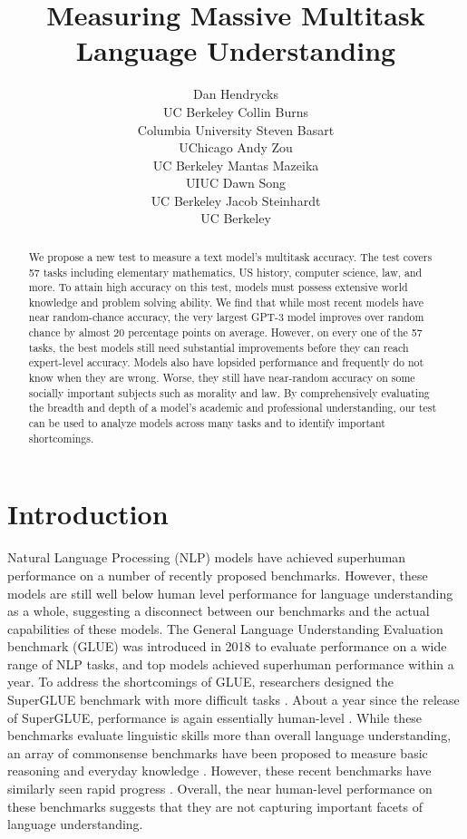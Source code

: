 \documentclass{article} \usepackage{iclr2021_conference, times}
\title{Measuring Massive Multitask\\Language Understanding}
\author{
Dan Hendrycks\\UC Berkeley \And Collin Burns\\Columbia University \And Steven Basart\\UChicago \And Andy Zou\\UC Berkeley \AND Mantas Mazeika\\UIUC \And Dawn Song\\UC Berkeley \And Jacob Steinhardt\\UC Berkeley\AND
}
\begin{document}
\maketitle

\vspace{-35pt}
\begin{abstract}
We propose a new test to measure a text model's multitask accuracy. The test covers 57 tasks including elementary mathematics, US history, computer science, law, and more. To attain high accuracy on this test, models must possess extensive world knowledge and problem solving ability. We find that while most recent models have near random-chance accuracy, the very largest GPT-3 model improves over random chance by almost 20 percentage points on average. However, on every one of the 57 tasks, the best models still need substantial improvements before they can reach expert-level accuracy. Models also have lopsided performance and frequently do not know when they are wrong. Worse, they still have near-random accuracy on some socially important subjects such as morality and law. By comprehensively evaluating the breadth and depth of a model's academic and professional understanding, our test can be used to analyze models across many tasks and to identify important shortcomings.
\end{abstract}









\section{Introduction}

Natural Language Processing (NLP) models have achieved superhuman performance on a number of recently proposed benchmarks. 
However, these models are still well below human level performance for language understanding as a whole, suggesting a disconnect between our benchmarks and the actual capabilities of these models. 
The General Language Understanding Evaluation benchmark (GLUE) \citep{wang2018glue} was introduced in 2018 to evaluate performance on a wide range of NLP tasks, and top models achieved superhuman performance within a year. To address the shortcomings of GLUE, researchers designed the SuperGLUE benchmark with more difficult tasks \citep{wang2019superglue}. About a year since the release of SuperGLUE, performance is again essentially human-level \citep{raffel2019exploringT5}. While these benchmarks evaluate linguistic skills more than overall language understanding, an array of commonsense benchmarks have been proposed to measure basic reasoning and everyday knowledge \citep{zellers2019hellaswag,huang2019cosmosqa,bisk2019physicaliqa}. 
However, these recent benchmarks have similarly seen rapid progress \citep{khashabi2020unifiedqa}. Overall, the near human-level performance on these benchmarks suggests that they are not capturing important facets of language understanding.
\end{document}
